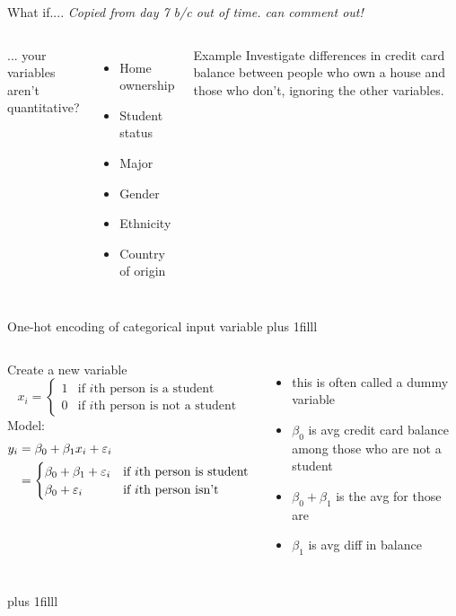 \documentclass[aspectratio=169,usenames,dvipsnames]{beamer}
\newcommand{\InstructorNotes}[1]{\textit{\color{orange}#1}}
\newcommand{\InstructorList}[1]{
\begin{itemize}
	\color{orange}
	#1
\end{itemize}
}
\newcommand{\bvfill}{\vskip0pt plus 1filll}
\begin{document}
	\begin{frame}[c]{What if....}
	\InstructorNotes{Copied from day 7 b/c out of time. can comment out!}
	\begin{columns}
	\centering
	... your variables aren't quantitative?
	
	\begin{itemize}
		\item Home ownership
		\item Student status
		\item Major
		\item Gender
		\item Ethnicity
		\item Country of origin
	\end{itemize}
	\centering
	\begin{block}{Example}
	Investigate differences in credit card balance between people who own a house and those who don't, ignoring the other variables.
	\end{block}
	
	\end{columns}
	
	\end{frame}
	\begin{frame}[t]{One-hot encoding of categorical input variable }
	\bvfill
	\begin{columns}
	\column{.6\textwidth}
	Create a new variable
	\begin{equation*}
			x_i =
		\begin{cases}
			1 & \text{if $i$th person is a student}\\
			0 & \text{if $i$th person is not a student}
		\end{cases}
	\end{equation*}
	Model:
	\begin{align*}
	y_i &= \beta_0 + \beta_1x_i+\varepsilon_i\\
	&= 
		\begin{cases}
			\beta_0 + \beta_1+\varepsilon_i	 & \text{if $i$th person is student}\\
			\beta_0 +\varepsilon_i & \text{if $i$th person isn't}
		\end{cases}
	\end{align*}
	\column{.35\textwidth}
	\tiny
	\InstructorList{
	\item this is often called a dummy variable
	\item $\beta_0$ is avg credit card balance among those who are not a student 
	\item $\beta_0 + \beta_1$ is the avg for those are
	\item $\beta_1$ is avg diff in balance
	}
	\end{columns}
	\bvfill
	\end{frame}
\end{document}
